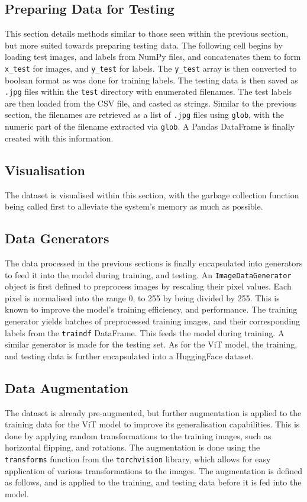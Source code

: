 \documentclass[../main]{subfiles}
\begin{document}
\subsection{Preparing Data for Testing}
This section details methods similar to those seen within the previous section,
but more suited towards preparing testing data. The following cell begins by
loading test images, and labels from NumPy files, and concatenates them to form
\texttt{x\_test} for images, and \texttt{y\_test} for labels. The
\texttt{y\_test} array is then converted to boolean format as was done for
training labels. The testing data is then saved as \texttt{.jpg} files within
the \texttt{test} directory with enumerated filenames. The test labels are then
loaded from the CSV file, and casted as strings. Similar to the previous
section, the filenames are retrieved as a list of \texttt{.jpg} files using
\texttt{glob}, with the numeric part of the filename extracted via
\texttt{glob}. A Pandas DataFrame is finally created with this information.

\subsection{Visualisation}
The dataset is visualised within this section, with the garbage
collection function being called first to alleviate the system's memory
as much as possible.
   
\subsection{Data Generators}
The data processed in the previous sections is finally encapsulated into
generators to feed it into the model during training, and testing. An
\texttt{ImageDataGenerator} object is first defined to preprocess images by
rescaling their pixel values. Each pixel is normalised into the range 0, to
255 by being divided by 255. This is known to improve the model's training
efficiency, and performance. The training generator yields batches of
preprocessed training images, and their corresponding labels from the
\texttt{traindf} DataFrame. This feeds the model during training. A similar
generator is made for the testing set. As for the ViT model, the training, and
testing data is further encapsulated into a HuggingFace dataset.

\subsection{Data Augmentation}
The dataset is already pre-augmented, but further augmentation is applied to
the training data for the ViT model to improve its generalisation capabilities.
This is done by applying random transformations to the training images, such as
horizontal flipping, and rotations. The augmentation is done using the
\texttt{transforms} function from the \texttt{torchvision} library, which
allows for easy application of various transformations to the images. The
augmentation is defined as follows, and is applied to the training, and testing
data before it is fed into the model.
\end{document}
